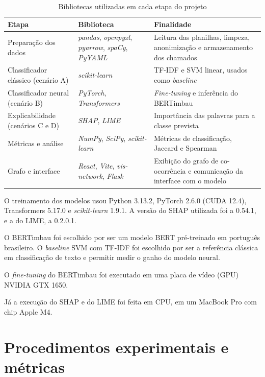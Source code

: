\documentclass[
    12pt,                %
    openright,           %
    oneside,             %
    a4paper,             %
    english,             %
    brazil               %
]{abntex2}
\begin{document}
\begin{table}[htb]
  \centering
  \caption{Bibliotecas utilizadas em cada etapa do projeto}
  \label{tab:ferramentas}
  \begin{tabular}{p{3.4cm}p{3.6cm}p{6.6cm}}
    \toprule
    Etapa & Biblioteca & Finalidade \\
    \midrule
    Preparação dos dados & \textit{pandas}, \textit{openpyxl}, \textit{pyarrow}, \textit{spaCy}, \textit{PyYAML} & Leitura das planilhas, limpeza, anonimização e armazenamento dos chamados \\
    Classificador clássico (cenário A) & \textit{scikit-learn} & TF-IDF e SVM linear, usados como \textit{baseline} \\
    Classificador neural (cenário B) & \textit{PyTorch}, \textit{Transformers} & \textit{Fine-tuning} e inferência do BERTimbau \\
    Explicabilidade (cenários C e D) & \textit{SHAP}, \textit{LIME} & Importância das palavras para a classe prevista \\
    Métricas e análise & \textit{NumPy}, \textit{SciPy}, \textit{scikit-learn} & Métricas de classificação, Jaccard e Spearman \\
    Grafo e interface & \textit{React}, \textit{Vite}, \textit{vis-network}, \textit{Flask} & Exibição do grafo de co-ocorrência e comunicação da interface com o modelo \\
    \bottomrule
  \end{tabular}
\end{table}

O treinamento dos modelos usou Python 3.13.2, PyTorch 2.6.0 (CUDA 12.4), Transformers 5.17.0 e \textit{scikit-learn} 1.9.1. A versão do SHAP utilizada foi a 0.54.1, e a do LIME, a 0.2.0.1.

O BERTimbau \cite{souza2020} foi escolhido por ser um modelo BERT pré-treinado em português brasileiro. O \textit{baseline} SVM com TF-IDF foi escolhido por ser a referência clássica em classificação de texto e permitir medir o ganho do modelo neural.

O \textit{fine-tuning} do BERTimbau foi executado em uma placa de vídeo (GPU) NVIDIA GTX 1650.

Já a execução do SHAP e do LIME foi feita em CPU, em um MacBook Pro com chip Apple M4.

\section{Procedimentos experimentais e métricas}
\end{document}
